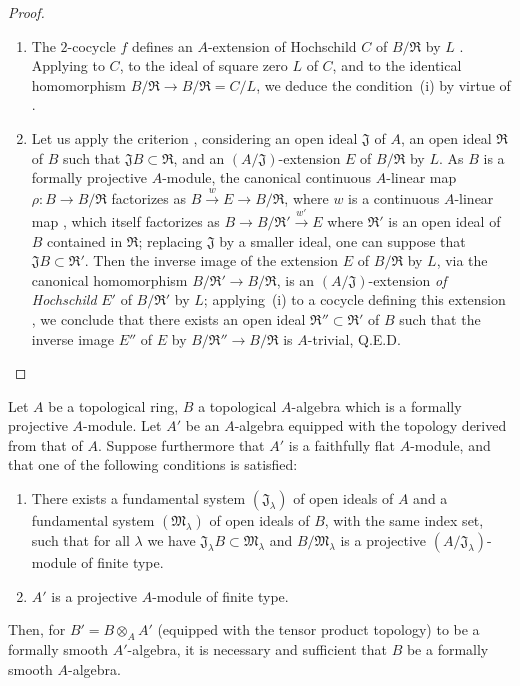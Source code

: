 \begin{proof}
\begin{enumerate}
  \item[\rm(i)] The $2$-cocycle $f$ defines an $A$-extension of Hochschild $C$ of $B/\mathfrak{R}$ by $L$ .
  Applying  to $C$, to the ideal of square zero $L$ of $C$, and to the identical homomorphism $B/\mathfrak{R}\to B/\mathfrak{R}=C/L$, we deduce the condition~(i) by virtue of .

  \item[\rm(ii)] Let us apply the criterion , considering an open ideal $\mathfrak{J}$ of $A$, an open ideal $\mathfrak{R}$ of $B$ such that $\mathfrak{J}B\subset\mathfrak{R}$, and an $(A/\mathfrak{J})$-extension $E$ of $B/\mathfrak{R}$ by $L$.
  As $B$ is a formally projective $A$-module, the canonical continuous $A$-linear map $\rho:B\to B/\mathfrak{R}$ factorizes as $B\xrightarrow{w}E\to B/\mathfrak{R}$, where $w$ is a continuous $A$-linear map ,
  which itself factorizes as $B\to B/\mathfrak{R}'\xrightarrow{w'}E$ where $\mathfrak{R}'$ is an open ideal of $B$ contained in $\mathfrak{R}$;
  replacing $\mathfrak{J}$ by a smaller ideal, one can suppose that $\mathfrak{J}B\subset\mathfrak{R}'$.
  Then the inverse image of the extension $E$ of $B/\mathfrak{R}$ by $L$, via the canonical homomorphism $B/\mathfrak{R}'\to B/\mathfrak{R}$, is an $(A/\mathfrak{J})$-extension \emph{of Hochschild} $E'$ of $B/\mathfrak{R}'$ by $L$;
  applying~(i) to a cocycle defining this extension , we conclude that there exists an open ideal $\mathfrak{R}''\subset\mathfrak{R}'$ of $B$ such that the inverse image $E''$ of $E$ by $B/\mathfrak{R}''\to B/\mathfrak{R}$ is $A$-trivial, Q.E.D.
\end{enumerate}
\end{proof}

\begin{corollary}[19.4.6]
\label{0.19.4.6}
Let $A$ be a topological ring, $B$ a topological $A$-algebra which is a formally projective $A$-module.
Let $A'$ be an $A$-algebra equipped with the topology derived from that of $A$.
Suppose furthermore that $A'$ is a faithfully flat $A$-module, and that one of the following conditions is satisfied:
\begin{enumerate}
  \item[$1^\circ$] There exists a fundamental system $(\mathfrak{J}_\lambda)$ of open ideals of $A$ and a fundamental system $(\mathfrak{M}_\lambda)$ of open ideals of $B$, with the same index set, such that for all $\lambda$ we have $\mathfrak{J}_\lambda B\subset\mathfrak{M}_\lambda$ and $B/\mathfrak{M}_\lambda$ is a projective $(A/\mathfrak{J}_\lambda)$-module of finite type.
  \item[$2^\circ$] $A'$ is a projective $A$-module of finite type.
\end{enumerate}
Then, for $B'=B\otimes_A A'$ (equipped with the tensor product topology) to be a formally smooth $A'$-algebra, it is necessary and sufficient that $B$ be a formally smooth $A$-algebra.
\end{corollary}

